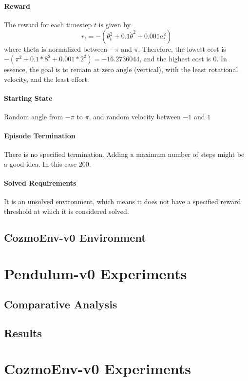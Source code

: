 	\paragraph{Reward}
	The reward for each timestep $t$ is given by \[r_t = -(\theta_t^2 + 0.1 \dot{\theta}^2 + 0.001 a_t^2)\]
	where theta is normalized between $-\pi$ and $\pi$. Therefore, the lowest cost is $-(\pi^2 + 0.1*8^2 + 0.001*2^2) = -16.2736044$, and the highest cost is $0$. In essence, the goal is to remain at zero angle (vertical), with the least rotational velocity, and the least effort.
	
	\paragraph{Starting State}
	Random angle from $-\pi$ to $\pi$, and random velocity between $-1$ and $1$
	\paragraph{Episode Termination}
	There is no specified termination. Adding a maximum number of steps might be a good idea. In this case 200.
	\paragraph{Solved Requirements}
	It is an unsolved environment, which means it does not have a specified reward threshold at which it is considered solved.
	


\subsection{CozmoEnv-v0 Environment}

\section{Pendulum-v0 Experiments}

\subsection{Comparative Analysis}

\subsection{Results}

\section{CozmoEnv-v0 Experiments}

